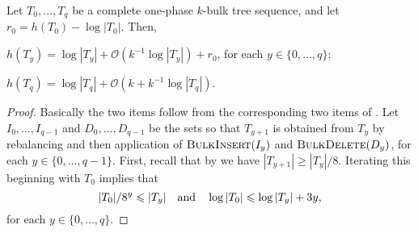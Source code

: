 \documentclass[kpfonts]{patmorin}
\newcommand{\Oh}{\mathcal{O}}
\let\le\leqslant
\let\ge\geqslant
\begin{document}
\begin{lem}
Let $T_0,\ldots,T_{q}$ be a complete one-phase $k$-bulk tree sequence, and let $r_0=h(T_0)-\log|T_0|$.  Then,
  \begin{compactenum}[(i)]
    \item $h(T_y)= \log|T_y| + \Oh(k^{-1}\log|T_y|) + r_0$, for each $y\in\{0,\ldots,q\}$;
    \label{bulktree-height-item-i}
    \item $h(T_{q}) = \log|T_{q}|+\Oh(k+k^{-1}\log|T_{q}|)$.\label{bulktree-height-item-ii}
  \end{compactenum}
\end{lem}
\begin{proof}
Basically the two items follow from the corresponding two items of .
Let $I_0,\ldots,I_{q-1}$ and $D_0,\ldots,D_{q-1}$ be the sets so that $T_{y+1}$ is obtained from $T_y$ by
rebalancing and then application of $\textsc{BulkInsert}(I_y)$ and $\textsc{BulkDelete}(D_y)$, for each $y\in\{0,\ldots,q-1\}$.
First, recall that by  we have $|T_{y+1}|\ge |T_y|/8$.
Iterating this beginning with $T_0$ implies that
  \begin{equation}
    |T_0|/8^y\le |T_y|\quad \text{and} \quad \log|T_0| \le \log|T_y| + 3y, \eqlabel{height-diff}
  \end{equation}
  for each $y\in\{0,\ldots,q\}$.


\end{proof}
\end{document}
